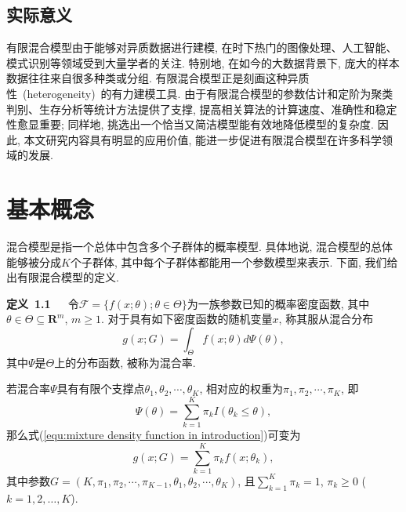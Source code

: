 \documentclass[a4paper,12pt,openany,oneside,utf-8]{ctexbook}
\newcommand{\xiaosihao}{\fontsize{12pt}{\baselineskip}\selectfont}
\begin{document}
\subsection{实际意义}
有限混合模型由于能够对异质数据进行建模, 在时下热门的图像处理、人工智能、模式识别等领域受到大量学者的关注. 特别地, 在如今的大数据背景下, 庞大的样本数据往往来自很多种类或分组. 有限混合模型正是刻画这种异质性~(heterogeneity)~的有力建模工具. 由于有限混合模型的参数估计和定阶为聚类判别、生存分析等统计方法提供了支撑, 提高相关算法的计算速度、准确性和稳定性愈显重要; 同样地, 挑选出一个恰当又简洁模型能有效地降低模型的复杂度. 因此, 本文研究内容具有明显的应用价值, 能进一步促进有限混合模型在许多科学领域的发展.%

\section{基本概念}
混合模型是指一个总体中包含多个子群体的概率模型. 具体地说, 混合模型的总体能够被分成$K$个子群体, 其中每个子群体都能用一个参数模型来表示. 下面, 我们给出有限混合模型的定义.

\textbf{\xiaosihao 定义~1.1~}~~令$ \mathcal{F} = \{ f(x; \theta); \theta \in \Theta \}$为一族参数已知的概率密度函数, 其中$ \theta \in \Theta \subseteq \bm{R}^{m}$, $m\geq1$. 对于具有如下密度函数的随机变量$x$, 称其服从混合分布
\begin{equation}
\label{equ:mixture density function in introduction}
  g(x; G)=\int_{\Theta}f(x; \theta)d\Psi(\theta),
\end{equation}
其中$\Psi$是$\Theta$上的分布函数, 被称为混合率.

若混合率$\Psi$具有有限个支撑点$\theta_{1}, \theta_{2}, \cdots, \theta_{K}$, 相对应的权重为$\pi_{1}, \pi_{2}, \cdots, \pi_{K}$, 即
\begin{equation*}
  \Psi(\theta)=\sum_{k=1}^{K}\pi_{k}I(\theta_{k}\leq\theta),
\end{equation*}
那么式(\ref{equ:mixture density function in introduction})可变为
\begin{equation}
\label{equ:finite mixture density function in introduction}
  g(x; G)=\sum_{k=1}^{K}\pi_{k}f(x; \theta_{k}),
\end{equation}
其中参数$G=(K, \pi_{1}, \pi_{2}, \cdots, \pi_{K-1}, \theta_{1}, \theta_{2}, \cdots, \theta_{K})$, 且$\sum_{k=1}^{K}\pi_{k}=1$, $\pi_{k}\geq0$ ($k=1, 2, \ldots, K$).
\end{document}
